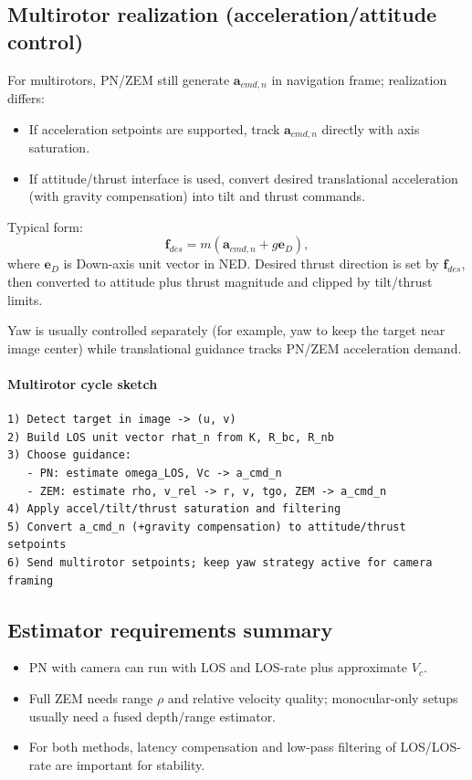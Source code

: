 \documentclass[11pt,a4paper]{article}
\begin{document}
\subsection{Multirotor realization (acceleration/attitude control)}
For multirotors, PN/ZEM still generate $\mathbf{a}_{cmd,n}$ in navigation frame; realization differs:
\begin{itemize}
    \item If acceleration setpoints are supported, track $\mathbf{a}_{cmd,n}$ directly with axis saturation.
    \item If attitude/thrust interface is used, convert desired translational acceleration (with gravity compensation) into tilt and thrust commands.
\end{itemize}
Typical form:
\begin{equation}
\mathbf{f}_{des} = m\left(\mathbf{a}_{cmd,n} + g\mathbf{e}_D\right),
\end{equation}
where $\mathbf{e}_D$ is Down-axis unit vector in NED. Desired thrust direction is set by $\mathbf{f}_{des}$, then converted to attitude plus thrust magnitude and clipped by tilt/thrust limits.

Yaw is usually controlled separately (for example, yaw to keep the target near image center) while translational guidance tracks PN/ZEM acceleration demand.

\paragraph{Multirotor cycle sketch}
\begin{verbatim}
1) Detect target in image -> (u, v)
2) Build LOS unit vector rhat_n from K, R_bc, R_nb
3) Choose guidance:
   - PN: estimate omega_LOS, Vc -> a_cmd_n
   - ZEM: estimate rho, v_rel -> r, v, tgo, ZEM -> a_cmd_n
4) Apply accel/tilt/thrust saturation and filtering
5) Convert a_cmd_n (+gravity compensation) to attitude/thrust setpoints
6) Send multirotor setpoints; keep yaw strategy active for camera framing
\end{verbatim}

\subsection*{Estimator requirements summary}
\begin{itemize}
    \item PN with camera can run with LOS and LOS-rate plus approximate $V_c$.
    \item Full ZEM needs range $\rho$ and relative velocity quality; monocular-only setups usually need a fused depth/range estimator.
    \item For both methods, latency compensation and low-pass filtering of LOS/LOS-rate are important for stability.
\end{itemize}
\end{document}
